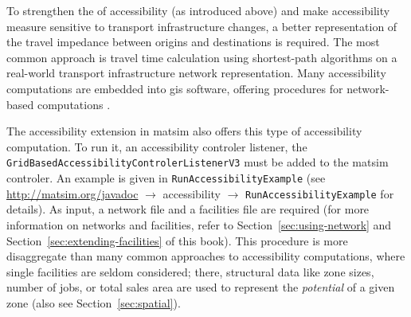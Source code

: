 
To strengthen the  of accessibility (as introduced above) and 
make accessibility measure sensitive to transport infrastructure changes, a better representation of the travel 
impedance between origins and destinations is required. The most common approach is  travel time calculation
using shortest-path algorithms on a real-world transport infrastructure network representation.
Many accessibility computations are embedded into \gls{gis} software, offering procedures for network-based 
computations 
\citep{BBSRErreichbarkeitsmodell, CurtisEtAl2013AccessibilityPolicyInnovation, BuettnerEtAl2010Erreichbarkeitsatlas}.

%

The accessibility extension in \gls{matsim} also offers this type of accessibility computation. To run it, an 
accessibility controler listener, \eg the \lstinline{GridBasedAccessibilityControlerListenerV3} must be added to 
the \gls{matsim} controler. An example is given in \lstinline{RunAccessibilityExample} (see
\url{http://matsim.org/javadoc} $\to$ accessibility $\to$ \lstinline{RunAccessibilityExample} for details). As input, a 
network file and a facilities file are required (for more information on networks and facilities, refer to 
Section~\ref{sec:using-network} and Section~\ref{sec:extending-facilities} of this book).
This procedure is more disaggregate than many common approaches to accessibility computations, where single 
facilities are seldom considered; there, structural data like zone sizes, number of jobs, or total sales area are used to 
represent the \emph{potential} of a given zone 
\citep{BuettnerEtAl2010Erreichbarkeitsatlas, GulhanEtAl2014PotentialAccessibilityMeasureDenizli} (also see
Section~\ref{sec:spatial}).


